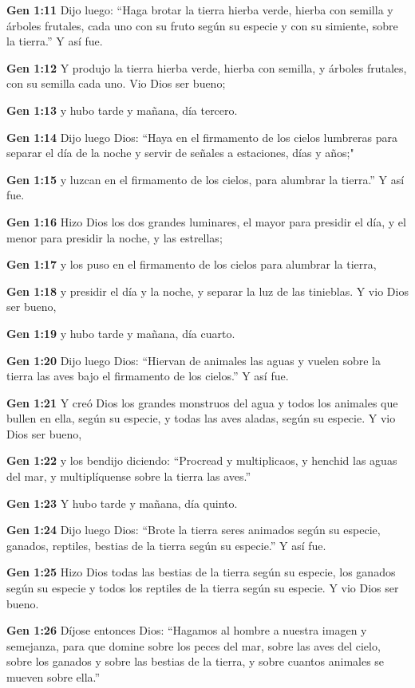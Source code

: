 \textbf{Gen 1:11} Dijo luego: “Haga brotar la tierra hierba verde, hierba con semilla y árboles frutales, cada uno con su fruto según su especie y con su simiente, sobre la tierra.” Y así fue. 

\textbf{Gen 1:12} Y produjo la tierra hierba verde, hierba con semilla, y árboles frutales, con su semilla cada uno. Vio Dios ser bueno; 

\textbf{Gen 1:13} y hubo tarde y mañana, día tercero. 

\textbf{Gen 1:14} Dijo luego Dios: “Haya en el firmamento de los cielos lumbreras para separar el día de la noche y servir de señales a estaciones, días y años;" 

\textbf{Gen 1:15} y luzcan en el firmamento de los cielos, para alumbrar la tierra.” Y así fue. 

\textbf{Gen 1:16} Hizo Dios los dos grandes luminares, el mayor para presidir el día, y el menor para presidir la noche, y las estrellas; 

\textbf{Gen 1:17} y los puso en el firmamento de los cielos para alumbrar la tierra, 

\textbf{Gen 1:18} y presidir el día y la noche, y separar la luz de las tinieblas. Y vio Dios ser bueno, 

\textbf{Gen 1:19} y hubo tarde y mañana, día cuarto. 

\textbf{Gen 1:20} Dijo luego Dios: “Hiervan de animales las aguas y vuelen sobre la tierra las aves bajo el firmamento de los cielos.” Y así fue. 

\textbf{Gen 1:21} Y creó Dios los grandes monstruos del agua y todos los animales que bullen en ella, según su especie, y todas las aves aladas, según su especie. Y vio Dios ser bueno, 

\textbf{Gen 1:22} y los bendijo diciendo: “Procread y multiplicaos, y henchid las aguas del mar, y multiplíquense sobre la tierra las aves.” 

\textbf{Gen 1:23} Y hubo tarde y mañana, día quinto. 

\textbf{Gen 1:24} Dijo luego Dios: “Brote la tierra seres animados según su especie, ganados, reptiles, bestias de la tierra según su especie.” Y así fue. 

\textbf{Gen 1:25} Hizo Dios todas las bestias de la tierra según su especie, los ganados según su especie y todos los reptiles de la tierra según su especie. Y vio Dios ser bueno. 

\textbf{Gen 1:26} Díjose entonces Dios: “Hagamos al hombre a nuestra imagen y semejanza, para que domine sobre los peces del mar, sobre las aves del cielo, sobre los ganados y sobre las bestias de la tierra, y sobre cuantos animales se mueven sobre ella.” 

